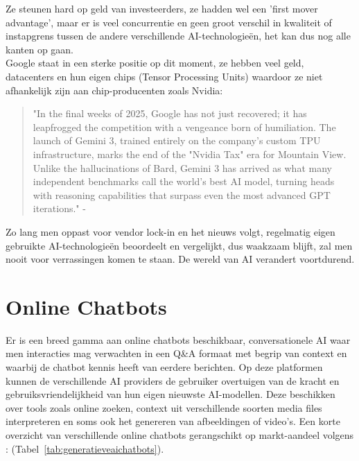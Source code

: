 Ze steunen hard op geld van investeerders, ze hadden wel een 'first mover advantage', maar er is veel concurrentie en geen groot verschil in kwaliteit of instapgrens tussen de andere verschillende AI-technologieën, het kan dus nog alle kanten op gaan. \\

Google staat in een sterke positie op dit moment, ze hebben veel geld, datacenters en hun eigen chips (Tensor Processing Units) waardoor ze niet afhankelijk zijn aan chip-producenten zoals Nvidia:

\begin{quote}
    "In the final weeks of 2025, Google has not just recovered; it has leapfrogged the competition with a vengeance born of humiliation. The launch of Gemini 3, trained entirely on the company's custom TPU infrastructure, marks the end of the "Nvidia Tax" era for Mountain View. Unlike the hallucinations of Bard, Gemini 3 has arrived as what many independent benchmarks call the world's best AI model, turning heads with reasoning capabilities that surpass even the most advanced GPT iterations."
    - \autocite{Gupta2025}
\end{quote}

Zo lang men oppast voor vendor lock-in en het nieuws volgt, regelmatig eigen gebruikte AI-technologieën beoordeelt en vergelijkt, dus waakzaam blijft, zal men nooit voor verrassingen komen te staan. De wereld van AI verandert voortdurend.

\section{Online Chatbots}
\label{sec:onlinechatbots}

Er is een breed gamma aan online chatbots beschikbaar, conversationele AI waar men interacties mag verwachten in een Q\&A formaat met begrip van context en waarbij de chatbot kennis heeft van eerdere berichten. Op deze platformen kunnen de verschillende AI providers de gebruiker overtuigen van de kracht en gebruiksvriendelijkheid van hun eigen nieuwste AI-modellen. Deze beschikken over tools zoals online zoeken, context uit verschillende soorten media files interpreteren en soms ook het genereren van afbeeldingen of video's. Een korte overzicht van verschillende online chatbots gerangschikt op markt-aandeel volgens \autocite{Bailyn2026}: (Tabel~\ref{tab:generatieveaichatbots}).

